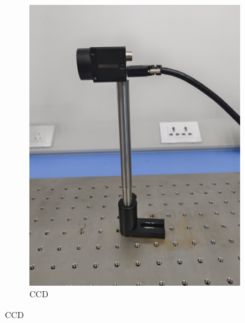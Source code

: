 \documentclass[a4paper]{report} %
\begin{document}
\begin{figure}[htbp]
\begin{subfigure}{0.22\textwidth}
        \includegraphics[width=\linewidth]{CCD.jpg}
        \caption{CCD}
    \end{subfigure}


\end{figure}
\end{document}
